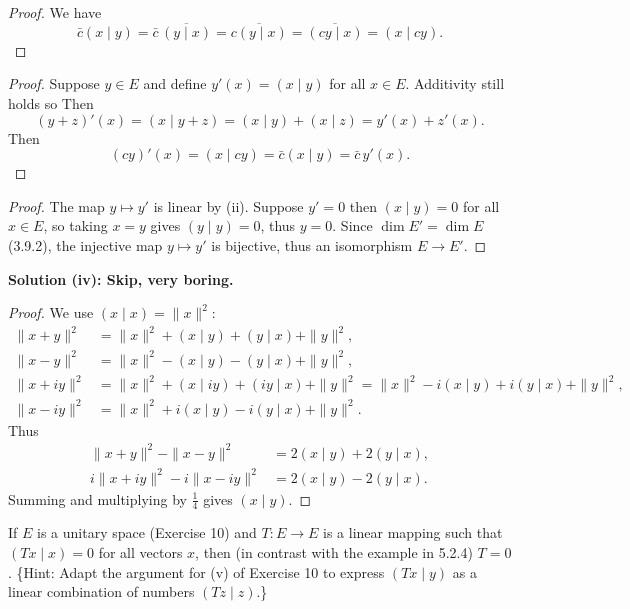 \begin{proof}
    We have
    \[\bar{c}(x \mid y) 
        = \bar{c}\,\overline{(y \mid x)} 
        = \overline{c(y \mid x)} 
        = \overline{(cy \mid x)} = (x \mid cy).\]
\end{proof}

\begin{proof}
    Suppose $y \in E$ and define $y'(x) = (x \mid y)$ for all $x \in E$. 
    Additivity still holds so
    Then
    \[(y+z)'(x) = (x \mid y+z) = (x \mid y) + (x \mid z) = y'(x) + z'(x).\]
    Then
    \[(cy)'(x) = (x \mid cy) = \bar{c}(x \mid y) = \bar{c}\,y'(x).\]
\end{proof}

\begin{proof}
    The map $y \mapsto y'$ is linear by (ii). 
    Suppose $y' = 0$ then $(x \mid y) = 0$ for all $x \in E$, 
        so taking $x = y$ gives $(y \mid y) = 0$, thus $y = 0$. 
    Since $\dim E' = \dim E$ (3.9.2), the injective map 
        $y \mapsto y'$ is bijective, thus an isomorphism $E \to E'$.
\end{proof}

\textbf{Solution (iv): Skip, very boring.}

\begin{proof}
    We use $(x \mid x) = \|x\|^2$:
    \begin{align*}
        \|x+y\|^2 &= \|x\|^2 + (x\mid y) + (y \mid x) + \|y\|^2,\\
        \|x-y\|^2 &= \|x\|^2 - (x\mid y) - (y \mid x) + \|y\|^2,\\
        \|x+iy\|^2 &= \|x\|^2 + (x\mid iy) + (iy\mid x) + \|y\|^2 = \|x\|^2 - i(x\mid y) + i(y\mid x) + \|y\|^2,\\
        \|x-iy\|^2 &= \|x\|^2 + i(x\mid y) - i(y\mid x) + \|y\|^2.
    \end{align*}
    Thus
    \begin{align*}
        \|x+y\|^2 - \|x-y\|^2 &= 2(x\mid y) + 2(y\mid x),\\
        i\|x+iy\|^2 - i\|x-iy\|^2 &= 2(x\mid y) - 2(y\mid x).
    \end{align*}
    Summing and multiplying by $\tfrac{1}{4}$ gives $(x \mid y)$.
\end{proof}


\begin{tcolorbox}[title=Problem 11, breakable]
If $E$ is a unitary space (Exercise 10) and $T : E \to E$ is a linear mapping such that $(Tx \mid x) = 0$ for all vectors $x$, then (in contrast with the example in 5.2.4) $T = 0$. \{Hint: Adapt the argument for (v) of Exercise 10 to express $(Tx \mid y)$ as a linear combination of numbers $(Tz \mid z)$.\}
\end{tcolorbox}

